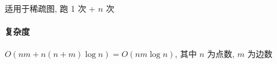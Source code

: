 适用于稀疏图, 跑 1 次  + \(n\) 次 

\paragraph{复杂度} \(O(nm+n(n+m)\log n)=O(nm\log n)\), 其中 \(n\) 为点数, \(m\) 为边数
